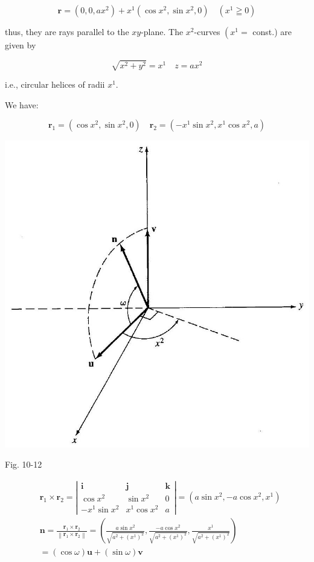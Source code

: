 \documentclass[10pt]{article}
\begin{document}
$$
\mathbf{r}=\left(0,0, a x^{2}\right)+x^{1}\left(\cos x^{2}, \sin x^{2}, 0\right) \quad\left(x^{1} \geqq 0\right)
$$

thus, they are rays parallel to the $x y$-plane. The $x^{2}$-curves $\left(x^{1}=\right.$ const.) are given by

$$
\sqrt{x^{2}+y^{2}}=x^{1} \quad z=a x^{2}
$$

i.e., circular helices of radii $x^{1}$.

We have:

$$
\mathbf{r}_{1}=\left(\cos x^{2}, \sin x^{2}, 0\right) \quad \mathbf{r}_{2}=\left(-x^{1} \sin x^{2}, x^{1} \cos x^{2}, a\right)
$$

\begin{center}
\includegraphics[max width=\textwidth]{2024_04_03_41f90be4f896e21f0dc9g-153}
\end{center}

Fig. 10-12

$$
\begin{aligned}
& \mathbf{r}_{1} \times \mathbf{r}_{2}=\left|\begin{array}{ccc}
\mathbf{i} & \mathbf{j} & \mathbf{k} \\
\cos x^{2} & \sin x^{2} & 0 \\
-x^{1} \sin x^{2} & x^{1} \cos x^{2} & a
\end{array}\right|=\left(a \sin x^{2},-a \cos x^{2}, x^{1}\right) \\
& \mathbf{n}=\frac{\mathbf{r}_{1} \times \mathbf{r}_{2}}{\left\|\mathbf{r}_{1} \times \mathbf{r}_{2}\right\|}=\left(\frac{a \sin x^{2}}{\sqrt{a^{2}+\left(x^{1}\right)^{2}}}, \frac{-a \cos x^{2}}{\sqrt{a^{2}+\left(x^{1}\right)^{2}}}, \frac{x^{1}}{\sqrt{a^{2}+\left(x^{1}\right)^{2}}}\right) \\
&=(\cos \omega) \mathbf{u}+(\sin \omega) \mathbf{v}
\end{aligned}
$$
\end{document}
